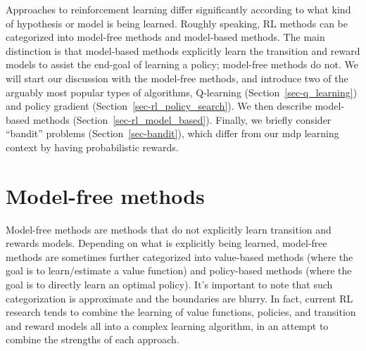 Approaches to reinforcement learning differ significantly according to
what kind of hypothesis or model is being learned. Roughly speaking, RL
methods can be categorized into model-free methods and model-based
methods. 
The main distinction is that model-based methods explicitly
learn the transition and reward models to assist the end-goal of
learning a policy; model-free methods do not.  We will start our discussion with the model-free
methods, and introduce two of the arguably most popular types of algorithms,
Q-learning (Section~\ref{sec-q_learning}) and policy gradient
(Section~\ref{sec-rl_policy_search}).  We then describe
model-based methods (Section~\ref{sec-rl_model_based}). Finally, we
briefly consider ``bandit'' problems (Section~\ref{sec-bandit}), which differ
from our {\sc mdp} learning context by having probabilistic rewards.




\section{Model-free methods}

Model-free methods are methods that do not explicitly learn transition
and rewards models. Depending on what is explicitly being learned,
model-free methods are sometimes further categorized into value-based
methods (where the goal is to learn/estimate a value function)
and
policy-based methods (where the goal is to directly learn an optimal policy). It's important to note that such
categorization is approximate and the boundaries are blurry. In fact,
current RL research tends to combine the learning of value functions,
policies, and transition and reward models all into a complex learning
algorithm, in an attempt to combine the strengths of each approach.




